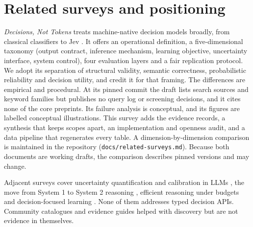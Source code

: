 \section{Related surveys and positioning}\label{sec:related-surveys-and-positioning}

\emph{Decisions, Not Tokens} treats machine-native decision models broadly, from classical classifiers to Jev \citep{decisionsnottokens2026}. It offers an operational definition, a five-dimensional taxonomy (output contract, inference mechanism, learning objective, uncertainty interface, system control), four evaluation layers and a fair replication protocol. We adopt its separation of structural validity, semantic correctness, probabilistic reliability and decision utility, and credit it for that framing. The differences are empirical and procedural. At its pinned commit the draft lists search sources and keyword families but publishes no query log or screening decisions, and it cites none of the core preprints. Its failure analysis is conceptual, and its figures are labelled conceptual illustrations. This survey adds the evidence records, a synthesis that keeps scopes apart, an implementation and openness audit, and a data pipeline that regenerates every table. A dimension-by-dimension comparison is maintained in the repository (\texttt{docs/related-surveys.md}). Because both documents are working drafts, the comparison describes pinned versions and may change.

Adjacent surveys cover uncertainty quantification and calibration in LLMs \citep{arxiv2503_15850}, the move from System 1 to System 2 reasoning \citep{arxiv2502_17419}, efficient reasoning under budgets \citep{arxiv2503_24377} and decision-focused learning \citep{arxiv2307_13565}. None of them addresses typed decision APIs. Community catalogues and evidence guides helped with discovery but are not evidence in themselves.
